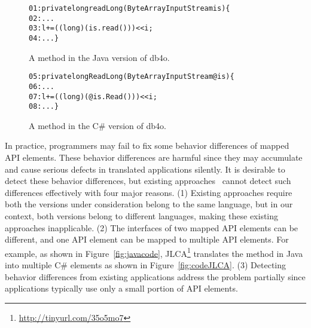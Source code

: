 \begin{figure}[t]
\begin{CodeOut}%
\begin{alltt}
01: private long readLong(ByteArrayInputStream is)\{
02:  ...
03:  l += ((long) (is.read())) << i;
04: ...\}
\end{alltt}
\end{CodeOut}\vspace*{-4ex}
\caption{A method in the Java version of db4o.}\vspace*{-2ex}
\label{fig:db4ojava}
\begin{CodeOut}%
\begin{alltt}
05: private long ReadLong(ByteArrayInputStream @is)\{
06:  ...
07:  l += ((long)(@is.Read())) << i;
08:  ...\}
\end{alltt}
\end{CodeOut}\vspace*{-4ex}
\caption{A method in the C\# version of db4o.}\vspace*{-4ex}
\label{fig:db40net}
\end{figure}

In practice, programmers may fail to fix some behavior differences of mapped API elements. These behavior differences are harmful since they may accumulate and cause serious defects in translated applications silently. It is desirable to detect these behavior differences, but existing approaches~\cite{taneja08diffgen, mckeeman1998differential} cannot detect such differences effectively with four major reasons. (1) Existing approaches require both the versions under consideration belong to the same language, but in our context, both versions belong to different languages, making these existing approaches inapplicable. (2) The interfaces of two mapped API elements can be different, and one API element can be mapped to multiple API elements. For example, as shown in Figure~\ref{fig:javacode}, JLCA\footnote{\url{http://tinyurl.com/35o5mo7}} translates the
 method in Java into multiple C\# elements as shown in Figure~\ref{fig:codeJLCA}. (3) Detecting behavior differences from existing applications address the problem partially since applications typically use only a small portion of API elements.


